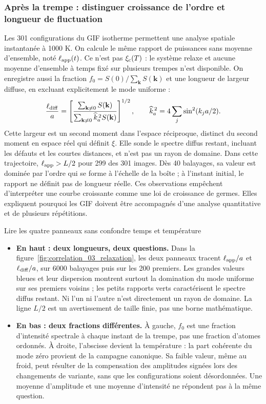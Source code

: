 \subsubsection{Après la trempe : distinguer croissance de l’ordre et longueur de fluctuation}
Les 301 configurations du GIF isotherme permettent une analyse spatiale instantanée à 1000 K. On calcule le même rapport de puissances sans moyenne d'ensemble, noté $\ell_{\rm app}(t)$. Ce n'est pas $\xi_{\rm c}(T)$ : le système relaxe et aucune moyenne d'ensemble à temps fixé sur plusieurs trempes n'est disponible.
On enregistre aussi la fraction $f_0=S(0)/\sum_{\mathbf k}S(\mathbf k)$ et une longueur de largeur diffuse, en excluant explicitement le mode uniforme :
\[\frac{\ell_{\rm diff}}a=\left[\frac{\sum_{\mathbf k\ne0}S(\mathbf k)}{\sum_{\mathbf k\ne0}\widehat k_a^{\,2}S(\mathbf k)}\right]^{1/2},\qquad \widehat k_a^{\,2}=4\sum_j\sin^2(k_ja/2).\]
Cette largeur est un second moment dans l'espace réciproque, distinct du second moment en espace réel qui définit $\xi$. Elle sonde le spectre diffus restant, incluant les défauts et les courtes distances, et n'est pas un rayon de domaine.
Dans cette trajectoire, $\ell_{\rm app}>L/2$ pour 299 des 301 images. Dès 40 balayages, sa valeur est dominée par l'ordre qui se forme à l'échelle de la boîte ; à l'instant initial, le rapport ne définit pas de longueur réelle. Ces observations empêchent d'interpréter une courbe croissante comme une loi de croissance de germes. Elles expliquent pourquoi les GIF doivent être accompagnés d'une analyse quantitative et de plusieurs répétitions.
\begin{oral}{Lire les quatre panneaux sans confondre temps et température}
\begin{itemize}
\item \textbf{En haut : deux longueurs, deux questions.} Dans la figure~\ref{fig:correlation_03_relaxation}, les deux panneaux tracent $\ell_{\rm app}/a$ et $\ell_{\rm diff}/a$, sur 6000 balayages puis sur les 200 premiers. Les grandes valeurs bleues et leur dispersion montrent surtout la domination du mode uniforme sur ses premiers voisins ; les petits rapports verts caractérisent le spectre diffus restant. Ni l'un ni l'autre n'est directement un rayon de domaine. La ligne $L/2$ est un avertissement de taille finie, pas une borne mathématique.
\item \textbf{En bas : deux fractions différentes.} À gauche, $f_0$ est une fraction d'intensité spectrale à chaque instant de la trempe, pas une fraction d'atomes ordonnés. À droite, l'abscisse devient la température : la part cohérente du mode zéro provient de la campagne canonique. Sa faible valeur, même au froid, peut résulter de la compensation des amplitudes signées lors des changements de variante, sans que les configurations soient désordonnées. Une moyenne d'amplitude et une moyenne d'intensité ne répondent pas à la même question.
\end{itemize}\end{oral}
